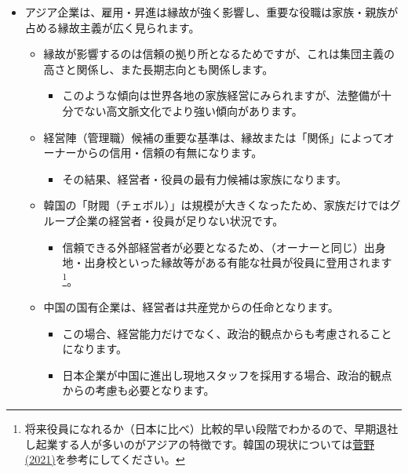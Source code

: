 \documentclass[
]{book}
\providecommand{\tightlist}{%
  \setlength{\itemsep}{0pt}\setlength{\parskip}{0pt}}
\begin{document}
\begin{itemize}
\item
  アジア企業は、雇用・昇進は縁故が強く影響し、重要な役職は家族・親族が占める縁故主義が広く見られます。

  \begin{itemize}
  \item
    縁故が影響するのは信頼の拠り所となるためですが、これは集団主義の高さと関係し、また長期志向とも関係します。

    \begin{itemize}
    \tightlist
    \item
      このような傾向は世界各地の家族経営にみられますが、法整備が十分でない高文脈文化でより強い傾向があります。
    \end{itemize}
  \item
    経営陣（管理職）候補の重要な基準は、縁故または「関係」によってオーナーからの信用・信頼の有無になります。

    \begin{itemize}
    \tightlist
    \item
      その結果、経営者・役員の最有力候補は家族になります。
    \end{itemize}
  \item
    韓国の「財閥（チェボル）」は規模が大きくなったため、家族だけではグループ企業の経営者・役員が足りない状況です。

    \begin{itemize}
    \tightlist
    \item
      信頼できる外部経営者が必要となるため、（オーナーと同じ）出身地・出身校といった縁故等がある有能な社員が役員に登用されます\footnote{将来役員になれるか（日本に比べ）比較的早い段階でわかるので、早期退社し起業する人が多いのがアジアの特徴です。韓国の現状については\href{https://toyokeizai.net/articles/-/473559}{菅野 (2021)}を参考にしてください。}。
    \end{itemize}
  \item
    中国の国有企業は、経営者は共産党からの任命となります。

    \begin{itemize}
    \item
      この場合、経営能力だけでなく、政治的観点からも考慮されることになります。
    \item
      日本企業が中国に進出し現地スタッフを採用する場合、政治的観点からの考慮も必要となります。
    \end{itemize}
  \end{itemize}
\end{itemize}
\end{document}
